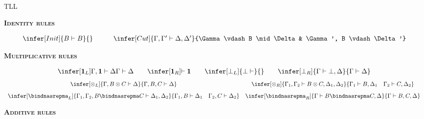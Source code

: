 \begin{entry}{TLL} 
\newcommand{\one}{\mathbf{1}}
\newcommand{\zero}{\mathbf{0}}
\newcommand\bang{\mathop{!}}
\newcommand\quest{\mathord{?}}
\newcommand\limp{\mathbin{-\hspace{-0.70mm}\circ}}
\newcommand\tensor\otimes




\begin{calculus}
\begin{center}
 \textsc{\bf Identity rules}
\end{center}
\vspace{-5px}
\[
\begin{array}{ccc}
\infer[Init]{B \vdash B}{}
&
\quad
&
\infer[Cut]{\Gamma, \Gamma' \vdash \Delta,\Delta'}{\Gamma \vdash B \mid \Delta & \Gamma', B \vdash \Delta'}
\end{array}
\]
\begin{center}
 \textsc{\bf Multiplicative rules}
\end{center}
\vspace{-5px}
\[
\begin{array}{cccc}
\infer[\one_L]{\Gamma,\one \vdash\Delta}{\Gamma \vdash \Delta}\quad
&
\infer[\one_R]{ \vdash \one}{}\quad
&
\infer[\bot_L]{\bot\vdash}{}\quad
&
\infer[\bot_R]{\Gamma\vdash\bot, \Delta}{\Gamma \vdash  \Delta}
\end{array}
\]
\[
\begin{array}{cc}
\infer[\otimes_L]{\Gamma,B\otimes C\vdash \Delta}{\Gamma,B,C\vdash \Delta}
& 
\infer[\otimes_R]{\Gamma_1,\Gamma_2 \vdash B\otimes C, \Delta_1,\Delta_2}{\Gamma_1 \vdash B,\Delta_1\quad\Gamma_2 \vdash C,\Delta_2}
\\[8pt]
  \infer[\bindnasrepma_L]{\Gamma_1,\Gamma_2,B\bindnasrepma C \vdash \Delta_1,\Delta_2}{\Gamma_1,B\vdash \Delta_1 \quad \Gamma_2,C\vdash \Delta_2}
  &
  \infer[\bindnasrepma_R]{\Gamma \vdash B \bindnasrepma C, \Delta}{\Gamma \vdash B,C,\Delta}
\end{array}
\]
\begin{center}
 \textsc{\bf Additive rules}
\end{center}
\vspace{-5px}
\[
\begin{array}{cc}

\end{array}\]
\end{calculus}
\end{entry}
